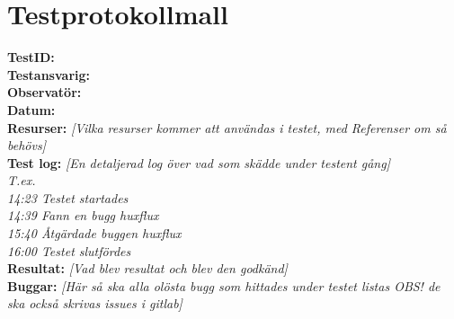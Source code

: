 \documentclass[a4paper,10pt, twoside]{article}
\begin{document}
\newpage

\section{Testprotokollmall}
\label{sec: Testprotokollmall}


 \textbf{TestID:}
\\ \textbf{Testansvarig:\\Observatör:}
\\ \textbf{Datum:}
\\ \textbf{Resurser:} \emph{[Vilka resurser kommer att användas i testet, med Referenser om så behövs]}
\\ \textbf{Test log:} \emph{[En detaljerad log över vad som skädde under testent gång]\\ T.ex. \\ 14:23 Testet startades \\ 14:39 Fann en bugg huxflux \\ 15:40 Åtgärdade buggen huxflux \\ 16:00 Testet slutfördes}\
\\ \textbf{Resultat:} \emph{[Vad blev resultat och blev den godkänd]}
\\ \textbf{Buggar:} \emph{[Här så ska alla olösta bugg som hittades under testet listas OBS! de ska också skrivas issues i gitlab]}
\end{document}

